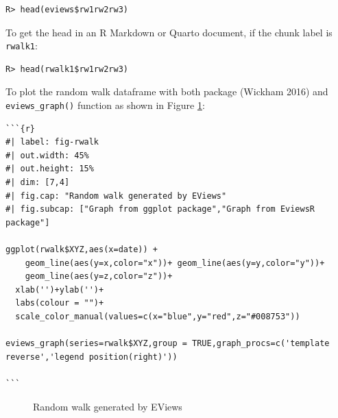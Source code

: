\begin{verbatim}
R> head(eviews$rw1rw2rw3)
\end{verbatim}

To get the head in an R Markdown or Quarto document, if the chunk label is \texttt{rwalk1}:

\begin{verbatim}
R> head(rwalk1$rw1rw2rw3)
\end{verbatim}

To plot the random walk dataframe with both  package (Wickham 2016) and \texttt{eviews\_graph()} function as shown in Figure \ref{fig:fig-rwalk}:

\begin{verbatim}
```{r}  
#| label: fig-rwalk
#| out.width: 45%
#| out.height: 15%
#| dim: [7,4]
#| fig.cap: "Random walk generated by EViews"
#| fig.subcap: ["Graph from ggplot package","Graph from EviewsR package"]

ggplot(rwalk$XYZ,aes(x=date)) +
    geom_line(aes(y=x,color="x"))+ geom_line(aes(y=y,color="y"))+
    geom_line(aes(y=z,color="z"))+
  xlab('')+ylab('')+
  labs(colour = "")+
  scale_color_manual(values=c(x="blue",y="red",z="#008753"))
  
eviews_graph(series=rwalk$XYZ,group = TRUE,graph_procs=c('template reverse','legend position(right)'))

```
\end{verbatim}

\begin{figure}

{\centering {}

}

\caption{Random walk generated by EViews}\label{fig:fig-rwalk}
\end{figure}

